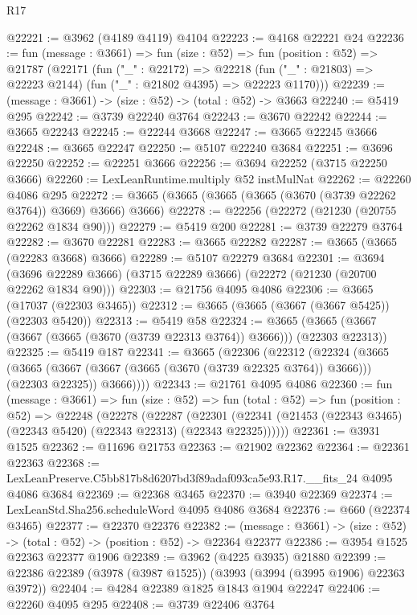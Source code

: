 \begin{lexlean}{R17}
\begin{coremodule}
@22221 := @3962 (@4189 @4119) @4104
@22223 := @4168 @22221 @24
@22236 := fun (message : @3661) =>
  fun (size : @52) =>
  fun (position : @52) =>
  @21787
    (@22171
      (fun ("_" : @22172) =>
      @22218 (fun ("_" : @21803) => @22223 @2144) (fun ("_" : @21802 @4395) => @22223 @1170)))
@22239 := (message : @3661) -> (size : @52) -> (total : @52) -> @3663
@22240 := @5419 @295
@22242 := @3739 @22240 @3764
@22243 := @3670 @22242
@22244 := @3665 @22243
@22245 := @22244 @3668
@22247 := @3665 @22245 @3666
@22248 := @3665 @22247
@22250 := @5107 @22240 @3684
@22251 := @3696 @22250
@22252 := @22251 @3666
@22256 := @3694 @22252 (@3715 @22250 @3666)
@22260 := LexLeanRuntime.multiply @52 instMulNat
@22262 := @22260 @4086 @295
@22272 := @3665 (@3665 (@3665 (@3665 (@3670 (@3739 @22262 @3764)) @3669) @3666) @3666)
@22278 := @22256 (@22272 (@21230 (@20755 @22262 @1834 @90)))
@22279 := @5419 @200
@22281 := @3739 @22279 @3764
@22282 := @3670 @22281
@22283 := @3665 @22282
@22287 := @3665 (@3665 (@22283 @3668) @3666)
@22289 := @5107 @22279 @3684
@22301 := @3694
    (@3696 @22289 @3666)
    (@3715 @22289 @3666)
    (@22272 (@21230 (@20700 @22262 @1834 @90)))
@22303 := @21756 @4095 @4086
@22306 := @3665 (@17037 (@22303 @3465))
@22312 := @3665 (@3665 (@3667 (@3667 @5425)) (@22303 @5420))
@22313 := @5419 @58
@22324 := @3665 (@3665 (@3667 (@3667 (@3665 (@3670 (@3739 @22313 @3764)) @3666))) (@22303 @22313))
@22325 := @5419 @187
@22341 := @3665
    (@22306
      (@22312
        (@22324
          (@3665
            (@3665 (@3667 (@3667 (@3665 (@3670 (@3739 @22325 @3764)) @3666))) (@22303 @22325))
            @3666))))
@22343 := @21761 @4095 @4086
@22360 := fun (message : @3661) =>
  fun (size : @52) =>
  fun (total : @52) =>
  fun (position : @52) =>
  @22248
    (@22278
      (@22287
        (@22301 (@22341 (@21453 (@22343 @3465) (@22343 @5420) (@22343 @22313) (@22343 @22325))))))
@22361 := @3931 @1525
@22362 := @11696 @21753
@22363 := @21902 @22362
@22364 := @22361 @22363
@22368 := LexLeanPreserve.C5bb817b8d6207bd3f89adaf093ca5e93.R17.__fits_24 @4095 @4086 @3684
@22369 := @22368 @3465
@22370 := @3940 @22369
@22374 := LexLeanStd.Sha256.scheduleWord @4095 @4086 @3684
@22376 := @660 (@22374 @3465)
@22377 := @22370 @22376
@22382 := (message : @3661) -> (size : @52) -> (total : @52) -> (position : @52) -> @22364 @22377
@22386 := @3954 @1525 @22363 @22377 @1906
@22389 := @3962 (@4225 @3935) @21880
@22399 := @22386 @22389 (@3978 (@3987 @1525)) (@3993 (@3994 (@3995 @1906) @22363 @3972))
@22404 := @4284 @22389 @1825 @1843 @1904 @22247
@22406 := @22260 @4095 @295
@22408 := @3739 @22406 @3764

\end{coremodule}
\end{lexlean}

